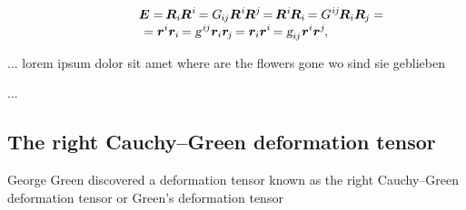 \nopagebreak\vspace{-0.4em}\begin{multline*}
\shoveleft{ \hspace{3em} \bm{E}
= \hspace{-0.2ex} \bm{R}_i \hspace{-0.1ex} \bm{R}^{\hspace{.1ex}i} \hspace{-0.2ex}
= G_{\hspace{-0.15ex}i\hspace{-0.1ex}j} \bm{R}^{\hspace{.1ex}i} \hspace{-0.2ex} \bm{R}^j \hspace{-0.25ex}
= \hspace{-0.2ex} \bm{R}^{\hspace{.1ex}i} \hspace{-0.2ex} \bm{R}_i \hspace{-0.2ex}
= G^{\hspace{.1ex}i\hspace{-0.1ex}j} \hspace{-0.2ex} \bm{R}_i \bm{R}_{\hspace{-0.1ex}j}
= \hfill }
\\[-0.3em]
= \bm{r}^i \bm{r}_i \hspace{-0.2ex}
= \textsl{g}^{\hspace{.2ex}i\hspace{-0.1ex}j} \bm{r}_i \bm{r}_{\hspace{-0.2ex}j} \hspace{-0.2ex}
= \bm{r}_i \bm{r}^i \hspace{-0.25ex}
= \textsl{g}_{i\hspace{-0.1ex}j} \hspace{.1ex} \bm{r}^i \bm{r}^j
\hspace{-0.2ex} ,
\end{multline*}

\vspace{-0.3em} \noindent {} ... lorem ipsum dolor sit amet where are the flowers gone wo sind sie geblieben

...


\subsection*{The right Cauchy\hbox{--}Green deformation tensor}

George Green discovered a deformation tensor known as the right Cauchy\hbox{--}Green deformation tensor or Green’s deformation tensor


